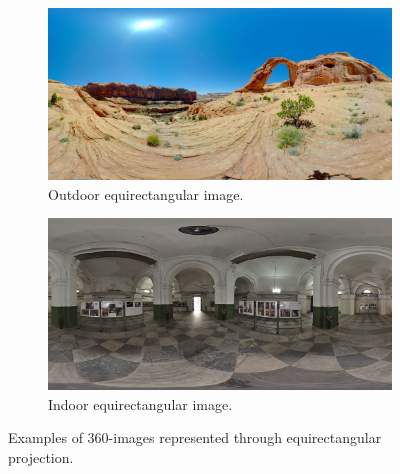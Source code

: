 \begin{figure}[!ht]
\centering
    \begin{subfigure}{0.47\linewidth}
        \centering
        \includegraphics[width=1\textwidth]{img/image (9).jpg}
        \caption{Outdoor equirectangular image.}
        \label{subfig:out_equi}
    \end{subfigure}\hfill
    \begin{subfigure}{0.47\linewidth}
        \centering
        \includegraphics[width=1\textwidth]{img/image (10).JPG}
        \caption{Indoor equirectangular image.}
        \label{subfig:in_equi}
    \end{subfigure}

\caption{Examples of 360-images represented through equirectangular projection.}
\label{fig:equirectangular_proj}
\end{figure}




